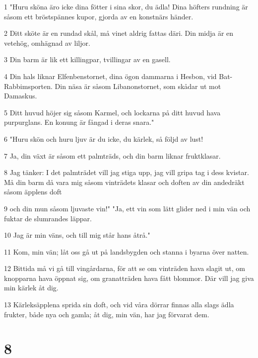 \par 1 "Huru sköna äro icke dina fötter i sina skor, du ädla! Dina höfters rundning är såsom ett bröstspännes kupor, gjorda av en konstnärs händer.
\par 2 Ditt sköte är en rundad skål, må vinet aldrig fattas däri. Din midja är en vetehög, omhägnad av liljor.
\par 3 Din barm är lik ett killingpar, tvillingar av en gasell.
\par 4 Din hals liknar Elfenbenstornet, dina ögon dammarna i Hesbon, vid Bat-Rabbimsporten. Din näsa är såsom Libanonstornet, som skådar ut mot Damaskus.
\par 5 Ditt huvud höjer sig såsom Karmel, och lockarna på ditt huvud hava purpurglans. En konung är fångad i deras snara."
\par 6 "Huru skön och huru ljuv är du icke, du kärlek, så följd av lust!
\par 7 Ja, din växt är såsom ett palmträds, och din barm liknar fruktklasar.
\par 8 Jag tänker: I det palmträdet vill jag stiga upp, jag vill gripa tag i dess kvistar. Må din barm då vara mig såsom vinträdets klasar och doften av din andedräkt såsom äpplens doft
\par 9 och din mun såsom ljuvaste vin!" "Ja, ett vin som lätt glider ned i min vän och fuktar de slumrandes läppar.
\par 10 Jag är min väns, och till mig står hans åtrå."
\par 11 Kom, min vän; låt oss gå ut på landsbygden och stanna i byarna över natten.
\par 12 Bittida må vi gå till vingårdarna, för att se om vinträden hava slagit ut, om knopparna hava öppnat sig, om granatträden hava fått blommor. Där vill jag giva min kärlek åt dig.
\par 13 Kärleksäpplena sprida sin doft, och vid våra dörrar finnas alla slags ädla frukter, både nya och gamla; åt dig, min vän, har jag förvarat dem.

\chapter{8}

